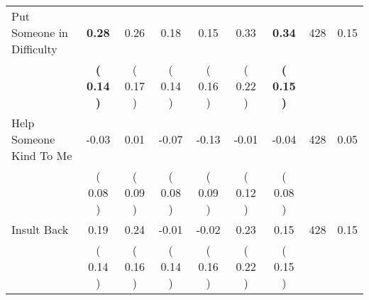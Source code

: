 \begin{tabular}{lcccccccc}
Put Someone in Difficulty & \textbf{     0.28} &      0.26 &      0.18 &      0.15 &      0.33 & \textbf{     0.34} & 428 &       0.15 \\ 
 & \textbf{(     0.14 )} & (     0.17 ) & (     0.14 ) & (     0.16 ) & (     0.22 ) & \textbf{(     0.15 )} & \\
Help Someone Kind To Me &     -0.03 &      0.01 &     -0.07 &     -0.13 &     -0.01 &     -0.04 & 428 &       0.05 \\ 
 & (     0.08 ) & (     0.09 ) & (     0.08 ) & (     0.09 ) & (     0.12 ) & (     0.08 ) & \\
Insult Back &      0.19 &      0.24 &     -0.01 &     -0.02 &      0.23 &      0.15 & 428 &       0.15 \\ 
 & (     0.14 ) & (     0.16 ) & (     0.14 ) & (     0.16 ) & (     0.22 ) & (     0.15 ) & \\
\bottomrule
\end{tabular}
